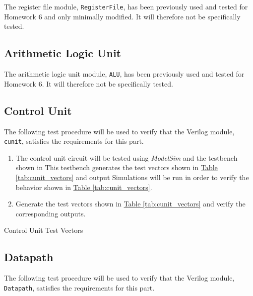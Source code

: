 The register file module, \verb|RegisterFile|, has been previously used and tested for Homework 6
and only minimally modified.
It will therefore not be specifically tested.

\subsection{Arithmetic Logic Unit} %
\label{sub:arithmetic_logic_unit}

The arithmetic logic unit module, \verb|ALU|, has been previously used and tested for Homework 6.
It will therefore not be specifically tested.

\subsection{Control Unit} %
\label{sub:control_unit}

The following test procedure will be used to verify that the Verilog module, \verb|cunit|, satisfies the requirements for this part.

\begin{enumerate}
    \item The control unit circuit will be tested using \emph{ModelSim} and the testbench shown in %
    This testbench generates the test vectors shown in \hyperref[tab:cunit_vectors]{Table \ref*{tab:cunit_vectors}} and output %
    Simulations will be run in order to verify the behavior shown in \hyperref[tab:cunit_vectors]{Table \ref*{tab:cunit_vectors}}.
    \item Generate the test vectors shown in \hyperref[tab:cunit_vectors]{Table \ref*{tab:cunit_vectors}}
    and verify the corresponding outputs.
\end{enumerate}

\begin{table}[htbp]
    \centering
    \caption{Control Unit Test Vectors\label{tab:cunit_vectors}}
\end{table}


\subsection{Datapath} %
\label{sub:datapath}

The following test procedure will be used to verify that the Verilog module, \verb|Datapath|, satisfies the requirements for this part.

